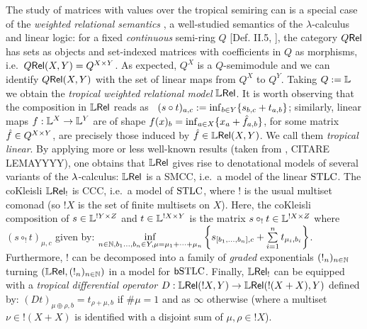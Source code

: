 \documentclass[submission,%
]{eptcs}
\begin{document}
The study of matrices with values over the tropical semiring can is a special case of the
\emph{weighted relational semantics} \cite{Manzo2013}, a well-studied semantics of the $\lambda$-calculus and linear logic:
for a fixed \emph{continuous} semi-ring $Q$ [Def. II.5, \cite{Manzo2013}], the category $Q \mathsf{Rel}$ has sets as objects and set-indexed matrices with coefficients in $Q$ as morphisms, i.e.~${Q \mathsf{Rel}}(X,Y)=Q^{X\times Y}$. %
As expected, $Q^X$ is a $Q$-semimodule and we can identify ${Q \mathsf{Rel}}(X,Y)$ with the set of linear maps from $Q^X$ to $Q^Y$.
Taking $Q:=\mathbb{L}$ we obtain the \emph{tropical weighted relational model} $\mathbb{L} \mathsf{Rel}$.
It is worth observing that the composition in $\mathbb{L} \mathsf{Rel}$ %
reads as \ $(s\circ t)_{a,c}:=\inf_{b\in Y}\{s_{b,c}+t_{a,b}\}$;
similarly, linear maps $f:\mathbb{L}^X\to \mathbb{L}^Y$ are of shape $f(x)_b=\inf_{a\in X} \{x_a+\hat{f}_{a,b}\}$, for some matrix $\hat{f}\in Q^{X\times Y}$, are precisely those induced by $\hat{f}\in{\mathbb{L}\mathsf{Rel}}(X,Y)$. We call them \emph{tropical linear}.
By applying more or less well-known results (taken from \cite{Manzo2013}, CITARE LEMAYYYY), one obtains that $\mathbb{L} \mathsf{Rel}$ gives rise to denotational models of several variants of the $\lambda$-calculus:
$\mathbb{L} \mathsf{Rel}$ is a SMCC, i.e.\ a model of the linear $\mathrm{STLC}$.
The coKleisli $\mathbb{L} \mathsf{Rel}_!$ is CCC, i.e.\ a model of $\mathrm{STLC}$, where $!$ is the usual multiset comonad (so $!X$ is the set of finite multisets on $X$).
Here, the coKleisli composition of $s\in\mathbb{L}^{!Y\times Z}$ and $t\in\mathbb{L}^{!X\times Y}$ is the matrix $s\circ_! t\in\mathbb{L}^{!X\times Z}$ where $(s\circ_! t)_{\mu,c}$ given by:
$
 \inf\limits_{n\in\mathbb{N}, b_1\dots,b_n\in Y, \mu = \mu_1+\cdots +\mu_n}
 \left\{s_{[b_1,\dots,b_n],c} + \sum\limits_{i=1}^n t_{\mu_i,b_i}\right\}$.
Furthermore, $!$ can be decomposed into a family of \emph{graded} exponentials $(!_n)_{n\in\mathbb{N}}$ turning $(\mathbb{L} \mathsf{Rel},(!_n)_{n\in\mathbb{N}})$ in a model for $\mathsf b\mathrm{STLC}$. 
Finally, $\mathbb{L} \mathsf{Rel}_!$ can be equipped with a \emph{tropical differential operator} $D:{\mathbb{L} \mathsf{Rel}}(!X,Y)\to {\mathbb{L}\mathsf{Rel}}(!(X+X),Y)$ defined by: $(Dt)_{\mu\oplus\rho,b}=t_{\rho+\mu,b}$ if $\#\mu=1$ and as $\infty$ otherwise (where a multiset $\nu \in !(X+X)$ is identified with a disjoint sum of $\mu,\rho\in !X$).
\end{document}
